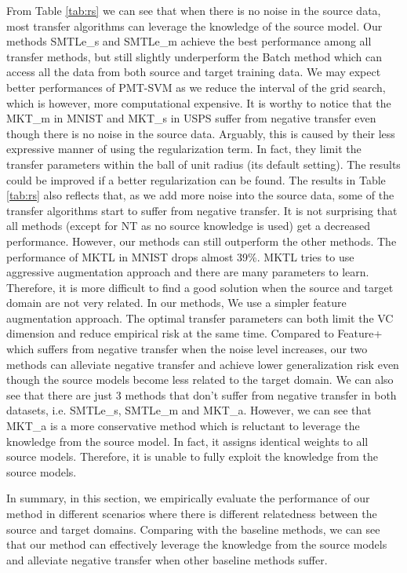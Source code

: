From Table \ref{tab:rs} we can see that when there is no noise in the source data, most transfer algorithms can leverage the knowledge of the source model. Our methods SMTLe\_s and SMTLe\_m achieve the best performance among all transfer methods, but still slightly underperform the Batch method which can access all the data from both source and target training data. We may expect better performances of PMT-SVM as we reduce the interval of the grid search, which is however, more computational expensive.  
It is worthy to notice that the MKT\_m in MNIST and MKT\_s in USPS suffer from negative transfer even though there is no noise in the source data. Arguably, this is caused by their less expressive manner of using the regularization term. In fact, they limit the transfer parameters within the ball of unit radius (its default setting). The results could be improved if a better regularization can be found.
The results in Table \ref{tab:rs} also reflects that, as we add more noise into the source data, some of the transfer algorithms start to suffer from negative transfer. It is not surprising that all methods (except for NT as no source knowledge is used) get a decreased performance. However, our methods can still outperform the other methods. The performance of MKTL in MNIST drops almost 39\%. MKTL tries to use aggressive augmentation approach and there are many parameters to learn. Therefore, it is more difficult to find a good solution when the source and target domain are not very related. 
In our methods, We use a simpler feature augmentation approach. The optimal transfer parameters can both limit the VC dimension and reduce empirical risk at the same time. Compared to Feature+ which suffers from negative transfer when the noise level increases, our two methods can alleviate negative transfer and achieve lower generalization risk even though the source models become less related to the target domain. We can also see that there are just 3 methods that don't suffer from negative transfer in both datasets, i.e. SMTLe\_s, SMTLe\_m and MKT\_a. However, we can see that MKT\_a is a more conservative method which is reluctant to leverage the knowledge from the source model. In fact, it assigns identical weights to all source models. Therefore, it is unable to fully exploit the knowledge from the source models.

In summary, in this section, we empirically evaluate the performance of our method in different scenarios where there is different relatedness between the source and target domains. Comparing with the baseline methods, we can see that our method can effectively leverage the knowledge from the source models and alleviate negative transfer when other baseline methods suffer.

